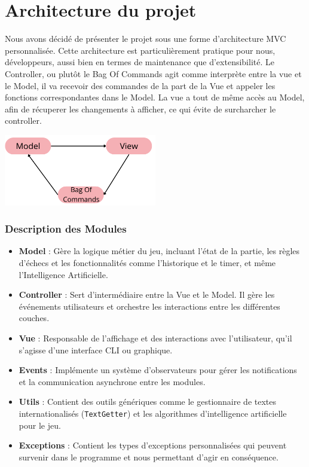 \documentclass{article}
\begin{document}
\section{Architecture du projet}
Nous avons décidé de présenter le projet sous une forme d'architecture MVC personnalisée. Cette architecture est particulièrement pratique pour nous, développeurs, aussi bien en termes de maintenance que d'extensibilité.
Le Controller, ou plutôt le Bag Of Commands agit comme interprète entre la vue et le Model, il va recevoir des commandes de la part de la Vue et appeler les fonctions correspondantes dans le Model.
La vue a tout de même accès au Model, afin de récuperer les changements à afficher, ce qui évite de surcharcher le controller.

\begin{center}
    \includegraphics[width=0.5\textwidth]{MVC}
\end{center}

\subsubsection{Description des Modules}

\begin{itemize}
    \item \textbf{Model} : Gère la logique métier du jeu, incluant l'état de la partie, les règles d'échecs et les fonctionnalités comme l'historique et le timer, et même l'Intelligence Artificielle.
    \item \textbf{Controller} : Sert d'intermédiaire entre la Vue et le Model. Il gère les événements utilisateurs et orchestre les interactions entre les différentes couches.
    \item \textbf{Vue} : Responsable de l'affichage et des interactions avec l'utilisateur, qu'il s'agisse d'une interface CLI ou graphique.
    \item \textbf{Events} : Implémente un système d'observateurs pour gérer les notifications et la communication asynchrone entre les modules.
    \item \textbf{Utils} : Contient des outils génériques comme le gestionnaire de textes internationalisés (\texttt{TextGetter}) et les algorithmes d'intelligence artificielle pour le jeu.
    \item \textbf{Exceptions} : Contient les types d'exceptions personnalisées qui peuvent survenir dans le programme et nous permettant d'agir en conséquence.
\end{itemize}
\end{document}
